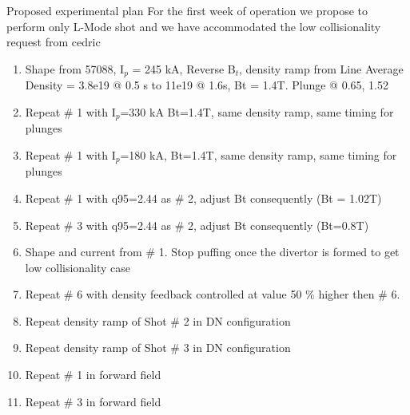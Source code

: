 \documentclass[10pt, compress]{beamer}
\newcommand\Fontvi{\fontsize{8}{7.2}\selectfont}
\begin{document}
  \begin{frame}{Proposed experimental plan}
\Fontvi
    \alert{For the first week of operation we propose to perform only
  L-Mode shot and we have accommodated the low collisionality request
  from cedric}
\begin{enumerate}
\item Shape from 57088, I$_p$ = 245 kA,  Reverse B$_t$,
    density ramp from Line Average Density = 3.8e19 @ 0.5 s to 11e19 @ 1.6s,  Bt = 1.4T. Plunge @ 0.65, 1.52
\item  Repeat \# 1 with I$_p$=330 kA Bt=1.4T, same density ramp, same timing for plunges
\item  Repeat \# 1 with I$_p$=180 kA, Bt=1.4T, same density ramp, same timing for plunges
\item  Repeat \# 1 with q95=2.44 as \# 2, adjust Bt consequently (Bt = 1.02T)
\item  Repeat \# 3 with q95=2.44 as \# 2, adjust Bt consequently (Bt=0.8T)
\item  Shape and current from \# 1. Stop puffing once the divertor is formed to get low collisionality case
\item  Repeat \# 6 with density feedback controlled at value 50 \%
  higher then \# 6. 
\item  Repeat density ramp of Shot \# 2 in DN configuration 
\item  Repeat density ramp of Shot \# 3 in DN configuration 
\item Repeat \# 1 in forward field
\item Repeat \# 3 in forward field
\end{enumerate}
\end{frame}
\end{document}
